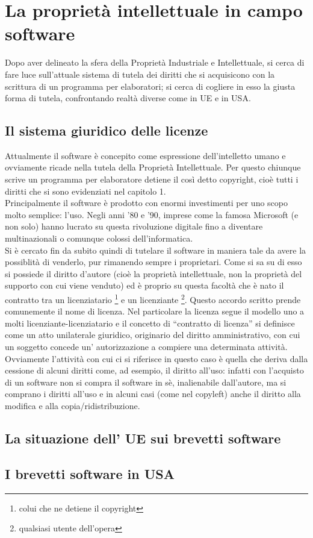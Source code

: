 \chapter{La proprietà intellettuale in campo software}
Dopo aver delineato la sfera della Proprietà Industriale e Intellettuale, si cerca di fare luce sull'attuale sistema di tutela dei diritti che si acquisicono con la scrittura di un programma per elaboratori; si cerca di cogliere in esso la giusta forma di tutela, confrontando realtà diverse come in UE e in USA. 

\section{Il sistema giuridico delle licenze}
Attualmente il software è concepito come espressione dell'intelletto umano e ovviamente ricade nella tutela della Proprietà Intellettuale. Per questo chiunque scrive un programma per elaboratore detiene il così detto copyright, cioè tutti i diritti che si sono evidenziati nel capitolo 1.\\
Principalmente il software è prodotto con enormi investimenti per uno scopo molto semplice: l'uso. Negli anni '80 e '90, imprese come la famosa Microsoft (e non solo) hanno lucrato su questa rivoluzione digitale fino a diventare multinazionali o comunque colossi dell'informatica.\\
Si è cercato fin da subito quindi di tutelare il software in maniera tale da avere la possiblità di venderlo, pur rimanendo sempre i proprietari. Come si sa su di esso si possiede il diritto d'autore (cioè la proprietà intellettuale, non la proprietà del supporto con cui viene venduto) ed è proprio su questa facoltà che è nato il contratto tra un licenziatario \footnote{colui che ne detiene il copyright} e un licenziante \footnote{qualsiasi utente dell'opera}. Questo accordo scritto prende comunemente il nome di licenza.
Nel particolare la licenza segue il modello uno a molti licenziante-licenziatario e il concetto di ``contratto di licenza'' si definisce come un atto unilaterale giuridico, originario del diritto amministrativo, con cui un soggetto concede un' autorizzazione a compiere una determinata attività.
Ovviamente l'attività con cui ci si riferisce in questo caso è quella che deriva dalla cessione di alcuni diritti come, ad esempio, il diritto all'uso: infatti con l'acquisto di un software non si compra il software in sè, inalienabile dall'autore, ma si comprano i diritti all'uso e in alcuni casi (come nel copyleft) anche il diritto alla modifica e alla copia/ridistribuzione.

\section{La situazione dell' UE sui brevetti software}

\section{I brevetti software in USA}
